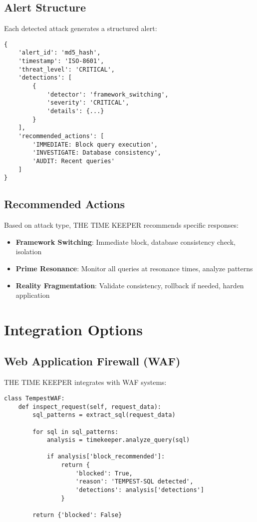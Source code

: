 \documentclass[11pt,a4paper]{article}
\begin{document}
\subsection{Alert Structure}

Each detected attack generates a structured alert:

\begin{verbatim}
{
    'alert_id': 'md5_hash',
    'timestamp': 'ISO-8601',
    'threat_level': 'CRITICAL',
    'detections': [
        {
            'detector': 'framework_switching',
            'severity': 'CRITICAL',
            'details': {...}
        }
    ],
    'recommended_actions': [
        'IMMEDIATE: Block query execution',
        'INVESTIGATE: Database consistency',
        'AUDIT: Recent queries'
    ]
}
\end{verbatim}

\subsection{Recommended Actions}

Based on attack type, THE TIME KEEPER recommends specific responses:

\begin{itemize}
    \item \textbf{Framework Switching}: Immediate block, database consistency check, isolation
    \item \textbf{Prime Resonance}: Monitor all queries at resonance times, analyze patterns
    \item \textbf{Reality Fragmentation}: Validate consistency, rollback if needed, harden application
\end{itemize}

\section{Integration Options}

\subsection{Web Application Firewall (WAF)}

THE TIME KEEPER integrates with WAF systems:

\begin{verbatim}
class TempestWAF:
    def inspect_request(self, request_data):
        sql_patterns = extract_sql(request_data)
        
        for sql in sql_patterns:
            analysis = timekeeper.analyze_query(sql)
            
            if analysis['block_recommended']:
                return {
                    'blocked': True,
                    'reason': 'TEMPEST-SQL detected',
                    'detections': analysis['detections']
                }
        
        return {'blocked': False}
\end{verbatim}
\end{document}
